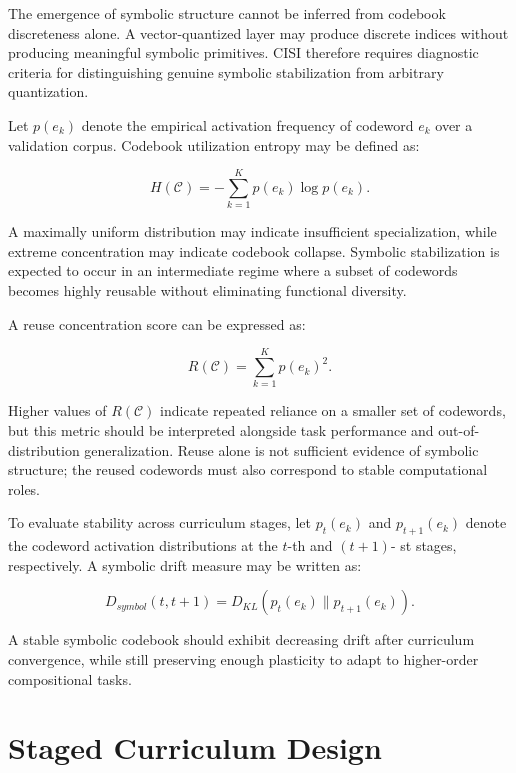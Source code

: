 The emergence of symbolic structure cannot be inferred from codebook discreteness alone. A vector-quantized layer may produce discrete indices without producing meaningful symbolic primitives. CISI therefore requires diagnostic criteria for distinguishing genuine symbolic stabilization from arbitrary quantization.

Let $p(e_k)$ denote the empirical activation frequency of codeword $e_k$ over a validation corpus. Codebook utilization entropy may be defined as:

\begin{equation}
H(\mathcal{C}) = - \sum_{k=1}^{K} p(e_k)\log p(e_k).
\end{equation}

A maximally uniform distribution may indicate insufficient specialization, while extreme concentration may indicate codebook collapse. Symbolic stabilization is expected to occur in an intermediate regime where a subset of codewords becomes highly reusable without eliminating functional diversity.

A reuse concentration score can be expressed as:

\begin{equation}
R(\mathcal{C}) = \sum_{k=1}^{K} p(e_k)^2.
\end{equation}

Higher values of $R(\mathcal{C})$ indicate repeated reliance on a smaller set of codewords, but this metric should be interpreted alongside task performance and out-of-distribution generalization. Reuse alone is not sufficient evidence of symbolic structure; the reused codewords must also correspond to stable computational roles.

To evaluate stability across curriculum stages, let $p_t(e_k)$ and $p_{t+1}(e_k)$ denote the codeword activation distributions at the $ t$-th and $ (t+1) $- st stages, respectively. A symbolic drift measure may be written as:

\begin{equation}
D_{symbol}(t,t+1) =
D_{KL}\left(p_t(e_k) \parallel p_{t+1}(e_k)\right).
\end{equation}

A stable symbolic codebook should exhibit decreasing drift after curriculum convergence, while still preserving enough plasticity to adapt to higher-order compositional tasks.

\chapter{Staged Curriculum Design}

